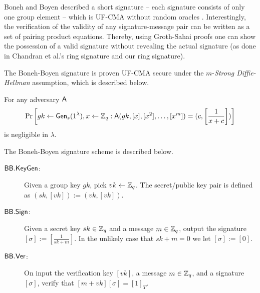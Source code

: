 Boneh and Boyen described a short signature -- each signature consists of only one group element -- which is UF-CMA without random oracles \cite{EC:BonBoy04a}. Interestingly, the verification of the validity of any signature-message pair can be written as a set of pairing product equations. Thereby, using Groth-Sahai proofs one can show the possession of a valid signature without revealing the actual signature (as done in Chandran et al.'s ring signature and our ring signature).

The Boneh-Boyen signature is proven UF-CMA secure under the $m$-\emph{Strong Diffie-Hellman} assumption, which is described below.

\begin{definition}
For any adversary $\mathsf{A}$
$$
\Pr\left[gk\gets\mathsf{Gen}_s(1^\lambda),x\gets\mathbb{Z}_q:\mathsf{A}(gk,[x],[x^2],\ldots,[x^m])=(c,\left[\frac{1}{x+c}\right])\right]
$$
is negligible in $\lambda$.
\end{definition}

The Boneh-Boyen signature scheme is described below.

\begin{description}
\item[$\mathsf{BB}.\mathsf{KeyGen}$:] Given a group key $gk$, pick $vk\gets\mathbb{Z}_q$. The secret/public key pair is defined as $(sk,[vk]):=(vk,[vk])$.
\item[$\mathsf{BB}.\mathsf{Sign}$:] Given a secret key $sk\in\mathbb{Z}_q$ and a message $m\in\mathbb{Z}_q$, output the signature $[\sigma]:=\left[\frac{1}{sk+m}\right]$. In the unlikely case that $sk+m=0$ we let $[\sigma]:=[0]$.
\item[$\mathsf{BB}.\mathsf{Ver}$:] On input the verification key $[vk]$, a message $m\in\mathbb{Z}_q$, and a signature $[\sigma]$, verify that $[m+vk][\sigma]=[1]_T$.
\end{description} 

